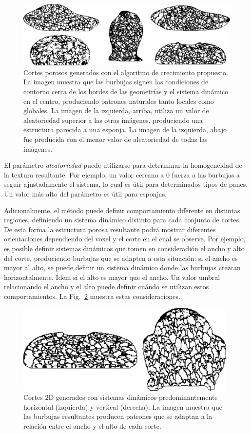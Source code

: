 \begin{figure}
  \centerline{\includegraphics[width=15cm]{figures/Fig5}}
  \caption{Cortes porosos generados con el algoritmo de crecimiento propuesto. La imagen muestra que las burbujas siguen las condiciones de contorno cerca de los bordes de las geometrías y el sistema dinámico en el centro, produciendo patrones naturales tanto locales como globales. La imagen de la izquierda, arriba, utiliza un valor de aleatoriedad superior a las otras imágenes, produciendo una estructura parecida a una esponja. La imagen de la izquierda, abajo fue producida con el menor valor de aleatoriedad de todas las imágenes.}
  \label{fg:Fig5}
\end{figure}

El parámetro {\em aleatoriedad} puede utilizarse para determinar la homogeneidad de la textura resultante.
Por ejemplo, un valor cercano a 0 fuerza a las burbujas a seguir ajustadamente el sistema, lo cual es útil para determinados tipos de panes.
Un valor más alto del parámetro es útil para esponjas.

Adicionalmente, el método puede definir comportamiento diferente en distintas regiones, definiendo un sistema dinámico distinto para cada conjunto de cortes.
De esta forma la estructura porosa resultante podrá mostrar diferentes orientaciones dependiendo del voxel y el corte en el cual se observe.
Por ejemplo, es posible definir sistemas dinámicos que tomen en consideradión el ancho y alto del corte, produciendo burbujas que se adapten a esta situación: si el ancho es mayor al alto, se puede definir un sistema dinámico donde las burbujas crezcan horizontalmente.
Ídem si el alto es mayor que el ancho.
Un valor umbral relacionando el ancho y el alto puede definir cuándo se utilizan estos comportamientos.
La Fig.~\ref{fg:Fig6} muestra estas consideraciones.


\begin{figure}
  \centerline{\includegraphics[width=11cm]{figures/Fig6}}
  \caption{Cortes 2D generados con sistemas dinámicos predominantemente horizontal (izquierda) y vertical (derecha). La imagen muestra que las burbujas resultantes producen patrones que se adaptan a la relación entre el ancho y el alto de cada corte.}
  \label{fg:Fig6}
\end{figure}


